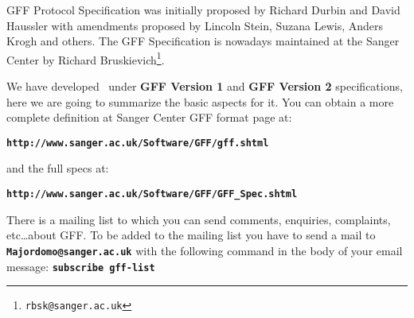 %
%
%
%

\label{sec:philoGFF}
\newcommand{\IR}[1]{ %
  \rule{2.5em}{0pt}\makebox[0cm][c]{\rotatebox{35}{\ $<$#1$>$}}
  } %

GFF Protocol Specification was initially proposed by Richard Durbin and David Haussler with amendments proposed by Lincoln Stein, Suzana Lewis, Anders Krogh and others. The GFF Specification is nowadays maintained at the Sanger Center by Richard Bruskievich\footnote{\texttt{rbsk@sanger.ac.uk}}.\par

We have developed \prog\ under \textbf{GFF Version 1} and \textbf{GFF Version 2} specifications, here we are going to summarize the basic aspects for it. You can obtain a more complete definition at Sanger Center GFF format page at:

  \centerline{\bfseries\texttt{http://www.sanger.ac.uk/Software/GFF/gff.shtml}} \vspace{0.5ex}

and the full specs at:

  \centerline{\bfseries\texttt{http://www.sanger.ac.uk/Software/GFF/GFF\_Spec.shtml}} \vspace{0.5ex}

There is a mailing list to which you can send comments, enquiries, complaints, etc\ldots about GFF. To be added to the mailing list you have to send a mail to \texttt{\bfseries Majordomo@sanger.ac.uk} with the following command in the body of your email message: \texttt{\bfseries subscribe gff-list}\par

